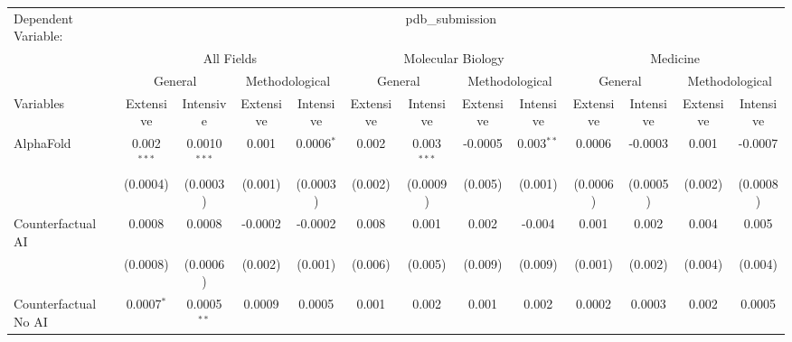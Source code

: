 \begingroup
\centering
\begin{tabular}{lcccccccccccc}
   \tabularnewline \midrule \midrule
   Dependent Variable: & \multicolumn{12}{c}{pdb\_submission}\\
 & \multicolumn{4}{c}{All Fields} & \multicolumn{4}{c}{Molecular Biology} & \multicolumn{4}{c}{Medicine} \\
\cmidrule(lr){2-5} \cmidrule(lr){6-9} \cmidrule(lr){10-13}
 & \multicolumn{2}{c}{General} & \multicolumn{2}{c}{Methodological} & \multicolumn{2}{c}{General} & \multicolumn{2}{c}{Methodological} & \multicolumn{2}{c}{General} & \multicolumn{2}{c}{Methodological} \\
\cmidrule(lr){2-3} \cmidrule(lr){4-5} \cmidrule(lr){6-7} \cmidrule(lr){8-9} \cmidrule(lr){10-11} \cmidrule(lr){12-13}
Variables & \multicolumn{1}{c}{Extensive} & \multicolumn{1}{c}{Intensive} & \multicolumn{1}{c}{Extensive} & \multicolumn{1}{c}{Intensive} & \multicolumn{1}{c}{Extensive} & \multicolumn{1}{c}{Intensive} & \multicolumn{1}{c}{Extensive} & \multicolumn{1}{c}{Intensive} & \multicolumn{1}{c}{Extensive} & \multicolumn{1}{c}{Intensive} & \multicolumn{1}{c}{Extensive} & \multicolumn{1}{c}{Intensive} \\
\cmidrule(lr){1-1}\cmidrule(lr){2-2} \cmidrule(lr){3-3} \cmidrule(lr){4-4} \cmidrule(lr){5-5} \cmidrule(lr){6-6} \cmidrule(lr){7-7} \cmidrule(lr){8-8} \cmidrule(lr){9-9} \cmidrule(lr){10-10} \cmidrule(lr){11-11} \cmidrule(lr){12-12} \cmidrule(lr){13-13}
   AlphaFold                                & 0.002$^{***}$ & 0.0010$^{***}$ & 0.001    & 0.0006$^{*}$ & 0.002   & 0.003$^{***}$ & -0.0005 & 0.003$^{**}$ & 0.0006   & -0.0003   & 0.001   & -0.0007\\   
                                            & (0.0004)      & (0.0003)       & (0.001)  & (0.0003)     & (0.002) & (0.0009)      & (0.005) & (0.001)      & (0.0006) & (0.0005)  & (0.002) & (0.0008)\\   
   Counterfactual AI                        & 0.0008        & 0.0008         & -0.0002  & -0.0002      & 0.008   & 0.001         & 0.002   & -0.004       & 0.001    & 0.002     & 0.004   & 0.005\\   
                                            & (0.0008)      & (0.0006)       & (0.002)  & (0.001)      & (0.006) & (0.005)       & (0.009) & (0.009)      & (0.001)  & (0.002)   & (0.004) & (0.004)\\   
   Counterfactual No AI                     & 0.0007$^{*}$  & 0.0005$^{**}$  & 0.0009   & 0.0005       & 0.001   & 0.002         & 0.001   & 0.002        & 0.0002   & 0.0003    & 0.002   & 0.0005\\   

\end{tabular}
